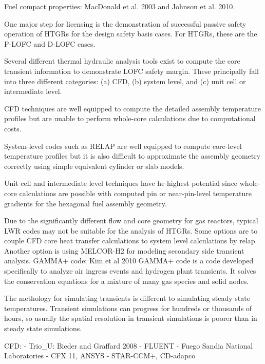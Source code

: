 Fuel compact properties: MacDonald et al. 2003 and Johnson et al. 2010.




One major step for licensing is the demonstration of successful passive safety operation of HTGRs for the design safety basis cases.
For HTGRs, these are the P-LOFC and D-LOFC cases.

Several different thermal hydraulic analysis tools exist to compute the core transient information to demonstrate LOFC safety margin.
These principally fall into three different categories: (a) CFD, (b) system level, and (c) unit cell or intermediate level.

CFD techniques are well equipped to compute the detailed assembly temperature profiles but are unable to perform whole-core calculations due to computational costs.

System-level codes such as RELAP are well equipped to compute core-level temperature profiles but it is also difficult to approximate the assembly geometry correctly using simple equivalent cylinder or slab models.

Unit cell and intermediate level techniques have he highest potential since whole-core calculations are possible with computed pin or near-pin-level temperature gradients for the hexagonal fuel assembly geometry.


Due to the significantly different flow and core geometry for gas reactors, typical LWR codes may not be suitable for the analysis of HTGRs.
Some options are to couple CFD core heat transfer calculations to system level calculations by relap.
Another option is using MELCOR-H2 for modeling secondary side transient analysis.
GAMMA+ code:
Kim et al 2010 %
GAMMA+ code is a code developed specifically to analyze air ingress events and hydrogen plant transients.
It solves the conservation equations for a mixture of many gas species and solid nodes.

The methology for simulating transients is different to simulating steady state temperatures.
Transient simulations can progress for hundreds or thousands of hours, so usually the spatial resolution in transient simulations is poorer than in steady state simulations.

CFD:
- Trio_U: Bieder and Graffard 2008 %
- FLUENT
- Fuego Sandia National Laboratories
- CFX 11, ANSYS
- STAR-CCM+, CD-adapco

